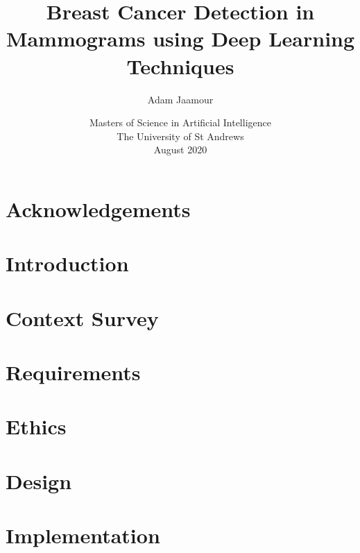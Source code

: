 \documentclass[11pt,openright,twoside,a4paper]{report}
\title{Breast Cancer Detection in Mammograms using Deep Learning Techniques}
\author{Adam Jaamour}
\date{Masters of Science in Artificial Intelligence\\The University of St Andrews\\August 2020}
\begin{document}
\setcounter{page}{0}

\maketitle
\newpage

\newpage

\abstract

\newpage

\setcounter{tocdepth}{4}
\tableofcontents
\newpage
\listoffigures
\newpage
\listoftables
\newpage

\chapter*{Acknowledgements}

\newpage


\setcounter{page}{1}

\chapter{Introduction}
\label{ch:chapter1}


\chapter{Context Survey}
\label{ch:chapter2}


\chapter{Requirements}
\label{ch:chapter3}


\chapter{Ethics}
\label{ch:chapter4}


\chapter{Design}
\label{ch:chapter5}


\chapter{Implementation}
\label{ch:chapter6}

\end{document}
